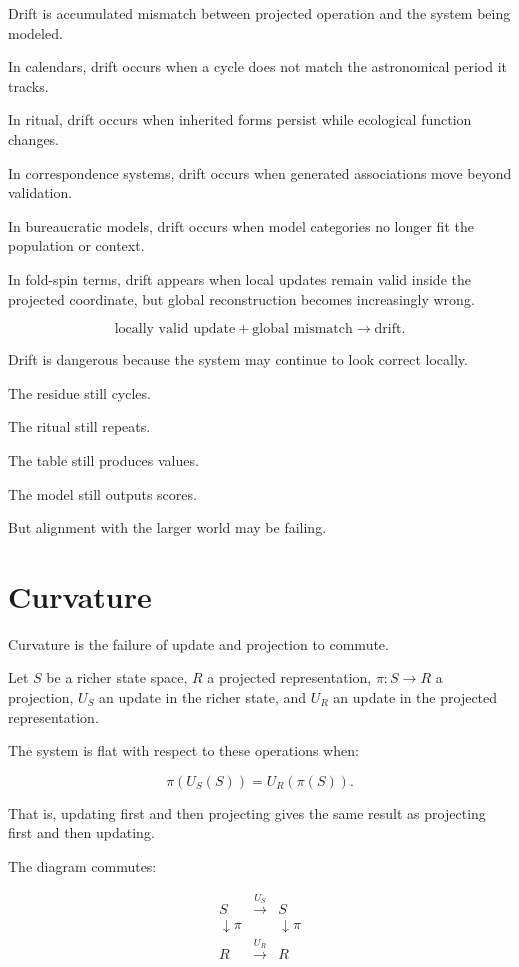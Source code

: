\documentclass[11pt]{book}
\begin{document}
Drift is accumulated mismatch between projected operation and the system being modeled.

In calendars, drift occurs when a cycle does not match the astronomical period it tracks.

In ritual, drift occurs when inherited forms persist while ecological function changes.

In correspondence systems, drift occurs when generated associations move beyond validation.

In bureaucratic models, drift occurs when model categories no longer fit the population or context.

In fold-spin terms, drift appears when local updates remain valid inside the projected coordinate, but global reconstruction becomes increasingly wrong.

\[
\text{locally valid update} + \text{global mismatch} \rightarrow \text{drift}.
\]

Drift is dangerous because the system may continue to look correct locally.

The residue still cycles.

The ritual still repeats.

The table still produces values.

The model still outputs scores.

But alignment with the larger world may be failing.

\section{Curvature}

Curvature is the failure of update and projection to commute.

Let \(S\) be a richer state space, \(R\) a projected representation, \(\pi:S \to R\) a projection, \(U_S\) an update in the richer state, and \(U_R\) an update in the projected representation.

The system is flat with respect to these operations when:

\[
\pi(U_S(S)) = U_R(\pi(S)).
\]

That is, updating first and then projecting gives the same result as projecting first and then updating.

The diagram commutes:

\[
\begin{array}{ccc}
S & \xrightarrow{U_S} & S \\
\downarrow \pi & & \downarrow \pi \\
R & \xrightarrow{U_R} & R
\end{array}
\]
\end{document}
